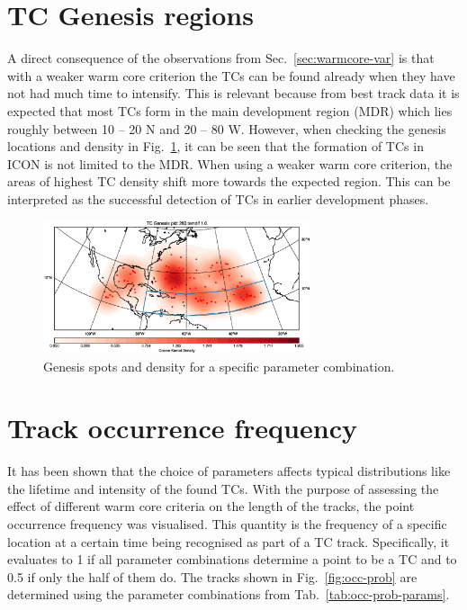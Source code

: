 \section{TC Genesis regions}
A direct consequence of the observations from Sec.~\ref{sec:warmcore-var} is that with a weaker warm core criterion the TCs can be found already when they have not had much time to intensify. This is relevant because from best track data it is expected that most TCs form in the main development region (MDR) which lies roughly between 10 -- 20 \degree N and 20 -- 80 \degree W. However, when checking the genesis locations and density in Fig.~\ref{fig:genesis-temdif1}, it can be seen that the formation of TCs in ICON is not limited to the MDR. When using a weaker warm core criterion, the areas of highest TC density shift more towards the expected region. This can be interpreted as the successful detection of TCs in earlier development phases.
\begin{figure}[ht]
	\centering
	\includegraphics[width=0.7\textwidth]{img/genesis_plot_temdif1.eps}
	\caption{Genesis spots and density for a specific parameter combination.}
	\label{fig:genesis-temdif1}
\end{figure}

\section{Track occurrence frequency }
It has been shown that the choice of parameters affects typical distributions like the lifetime and intensity of the found TCs. With the purpose of assessing the effect of different warm core criteria on the length of the tracks, the point occurrence frequency was visualised. This quantity is the frequency of a specific location at a certain time being recognised as part of a TC track. Specifically, it evaluates to 1 if all parameter combinations determine a point to be a TC and to 0.5 if only the half of them do. The tracks shown in Fig.~\ref{fig:occ-prob} are determined using the parameter combinations from Tab.~\ref{tab:occ-prob-params}.

